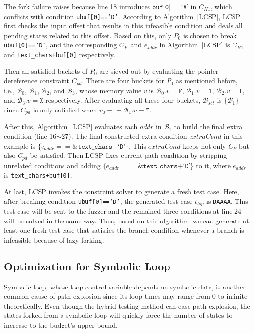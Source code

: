 \documentclass{cta-author}
\begin{document}
The fork failure raises because line 18 introduces $\texttt{buf[0]==`A'}$ in $C_{H1}$, which conflicts with condition \texttt{ubuf[0]==`D'}. 
According to Algorithm~\ref{LCSP}, 
LCSP first checks the input offset that results in this infeasible
condition and deals all pending states related to this offset. 
Based on this,
only $P_0$ is chosen to break \texttt{ubuf[0]==`D'}, and the
corresponding $C_H$ and $e_{addr}$ in Algorithm~\ref{LCSP} is $C_{H1}$ and 
\texttt{text\_chars+buf[0]} respectively.

Then all satisfied buckets of $P_0$ are sieved out by evaluating the 
pointer dereference constraint $C_{pd}$. 
There are four buckets for $P_0$ as mentioned before, i.e., $\mathcal{B}_0$, $\mathcal{B}_1$, $\mathcal{B}_2$, and $\mathcal{B}_3$, whose memory value
$v$ is $\mathcal{B}_0.v=\texttt{F}$, $\mathcal{B}_1.v=\texttt{T}$, $\mathcal{B}_2.v=\texttt{I}$, and $\mathcal{B}_3.v=\texttt{X}$ respectively. 
After evaluating all these four buckets, $\mathcal{B}_{sat}$ is $\{\mathcal{B}_1\}$ since
$C_{pd}$ is only satisfied when $v_0 == \mathcal{B}_1.v=\texttt{T}$.

After this, Algorithm~\ref{LCSP} evaluates each $addr$ in $\mathcal{B}_1$ to build the final extra condition (line 16$\sim$27). The final constructed extra
condition $extraCond$ in this example is $\{e_{addr}==\texttt{\&text\_chars+`D'}\}$.
This $extraCond$ keeps not only $C_F$ but also $C_{pd}$ be satisfied.
Then LCSP fixes current path condition by stripping unrelated conditions and adding
$\{e_{addr}==\texttt{\&text\_chars+`D'}\}$ to it, where $e_{addr}$ is \texttt{text\_chars+buf[0]}.

At last, LCSP invokes the constraint solver to 
generate a fresh test case. Here, after breaking condition \texttt{ubuf[0]==`D'}, the 
generated test case $t_{lsp}$ is \texttt{DAAAA}. This test case will be sent to the fuzzer and the
remained three conditions at line 24 will be solved in the same way. Thus, based on this algorithm, we can generate at least one fresh test case 
that satisfies the branch condition whenever a branch is infeasible 
because of lazy forking. 

\subsection{Optimization for Symbolic Loop}
Symbolic loop, whose loop control variable depends on symbolic data, 
is another common cause of path explosion since its loop times may 
range from 0 to infinite theoretically. 
Even though the hybrid testing method can ease path explosion, the 
states forked from a symbolic loop will quickly force the number of 
states to increase to the budget's upper bound. 
\end{document}

